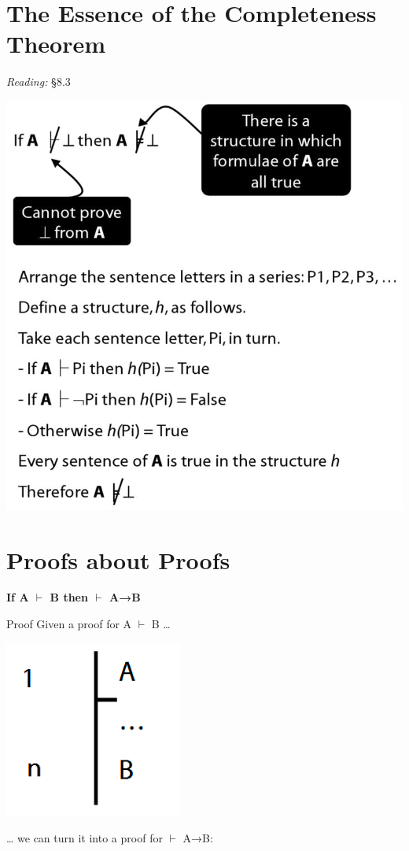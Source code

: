 \documentclass[12pt]{extarticle}
\begin{document}
\begin{multicols*}{3}
 
\section{The Essence of the Completeness Theorem}
 
\emph{Reading:} §8.3
 
\begin{center}
\includegraphics[scale=0.3]{img/unit_450.png}
\end{center}
 
 
\section{Proofs about Proofs}
 
\begin{minipage}{\columnwidth}
 
\textbf{If A $\vdash$ B then $\vdash$ A→B}
 
Proof Given a proof for A $\vdash$ B …
 
\begin{center}
\includegraphics[scale=0.3]{img/unit_440_a.png}
\end{center}
… we can turn it into a proof for $\vdash$ A→B:
 

\end{minipage}
\end{multicols*}
\end{document}
